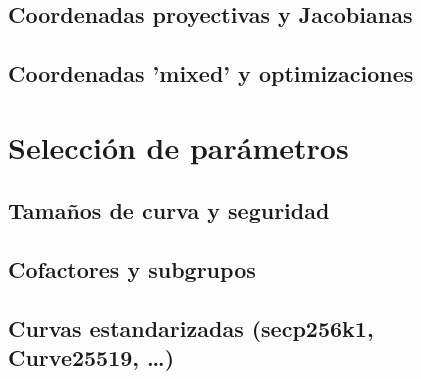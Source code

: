 \subsection{Coordenadas proyectivas y Jacobianas}
\subsection{Coordenadas 'mixed' y optimizaciones}

\section{Selección de parámetros}
\subsection{Tamaños de curva y seguridad}
\subsection{Cofactores y subgrupos}
\subsection{Curvas estandarizadas (secp256k1, Curve25519, …)}